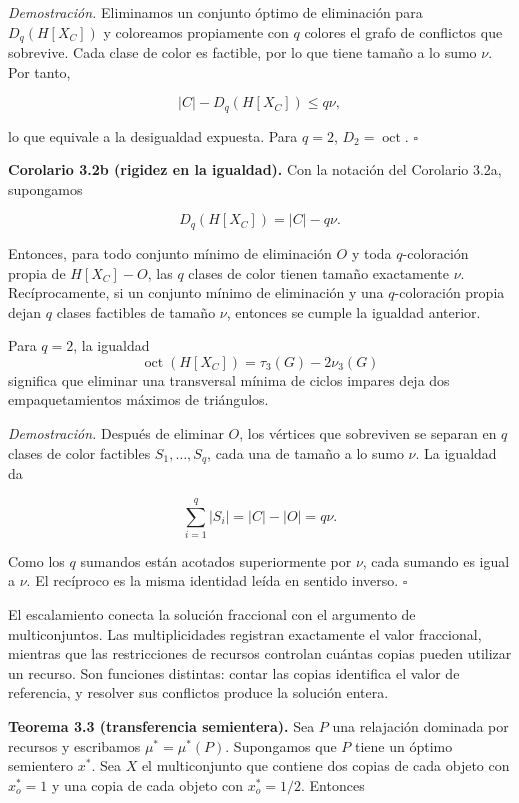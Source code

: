 \documentclass[spanish,11pt,a4paper]{article}
\begin{document}
\emph{Demostración.} Eliminamos un conjunto óptimo de eliminación para
\(D_q(H[X_C])\) y coloreamos propiamente con \(q\) colores el grafo de
conflictos que sobrevive. Cada clase de color es factible, por lo que
tiene tamaño a lo sumo \(\nu\). Por tanto,

\[
|C|-D_q(H[X_C])\le q\nu,
\]

lo que equivale a la desigualdad expuesta. Para \(q=2\),
\(D_2=\operatorname{oct}\). \(\square\)

\textbf{Corolario 3.2b (rigidez en la igualdad).} Con la notación del
Corolario 3.2a, supongamos

\[
D_q(H[X_C])=|C|-q\nu.
\]

Entonces, para todo conjunto mínimo de eliminación \(O\) y toda
\(q\)-coloración propia de \(H[X_C]-O\), las \(q\) clases de color
tienen tamaño exactamente \(\nu\). Recíprocamente, si un conjunto mínimo
de eliminación y una \(q\)-coloración propia dejan \(q\) clases
factibles de tamaño \(\nu\), entonces se cumple la igualdad anterior.

Para \(q=2\), la igualdad \[
\operatorname{oct}(H[X_C])=\tau_3(G)-2\nu_3(G)
\] significa que eliminar una transversal mínima de ciclos impares deja
dos empaquetamientos máximos de triángulos.

\emph{Demostración.} Después de eliminar \(O\), los vértices que
sobreviven se separan en \(q\) clases de color factibles
\(S_1,\ldots,S_q\), cada una de tamaño a lo sumo \(\nu\). La igualdad da

\[
\sum_{i=1}^q |S_i|=|C|-|O|=q\nu.
\]

Como los \(q\) sumandos están acotados superiormente por \(\nu\), cada
sumando es igual a \(\nu\). El recíproco es la misma identidad leída en
sentido inverso. \(\square\)

El escalamiento conecta la solución fraccional con el argumento de
multiconjuntos. Las multiplicidades registran exactamente el valor
fraccional, mientras que las restricciones de recursos controlan cuántas
copias pueden utilizar un recurso. Son funciones distintas: contar las
copias identifica el valor de referencia, y resolver sus conflictos
produce la solución entera.

\textbf{Teorema 3.3 (transferencia semientera).} Sea \(P\) una
relajación dominada por recursos y escribamos \(\mu^*=\mu^*(P)\).
Supongamos que \(P\) tiene un óptimo semientero \(x^*\). Sea \(X\) el
multiconjunto que contiene dos copias de cada objeto con \(x_o^*=1\) y
una copia de cada objeto con \(x_o^*=1/2\). Entonces
\end{document}
